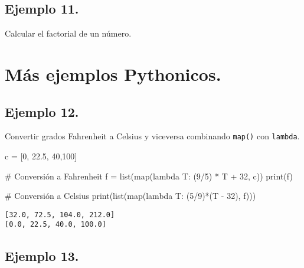 \documentclass[
  letterpaper,
  DIV=11,
  numbers=noendperiod]{scrreprt}
\newenvironment{Shaded}{\begin{snugshade}}{\end{snugshade}}
\newcommand{\BuiltInTok}[1]{\textcolor[rgb]{0.00,0.23,0.31}{#1}}
\newcommand{\CommentTok}[1]{\textcolor[rgb]{0.37,0.37,0.37}{#1}}
\newcommand{\DecValTok}[1]{\textcolor[rgb]{0.68,0.00,0.00}{#1}}
\newcommand{\FloatTok}[1]{\textcolor[rgb]{0.68,0.00,0.00}{#1}}
\newcommand{\KeywordTok}[1]{\textcolor[rgb]{0.00,0.23,0.31}{#1}}
\newcommand{\NormalTok}[1]{\textcolor[rgb]{0.00,0.23,0.31}{#1}}
\newcommand{\OperatorTok}[1]{\textcolor[rgb]{0.37,0.37,0.37}{#1}}
\begin{document}
\section{\texorpdfstring{\textbf{Ejemplo
11.}}{Ejemplo 11.}}\label{ejemplo-11.}

Calcular el factorial de un número.


\chapter{Más ejemplos Pythonicos.}\label{muxe1s-ejemplos-pythonicos.}

\section{\texorpdfstring{\textbf{Ejemplo
12.}}{Ejemplo 12.}}\label{ejemplo-12.}

Convertir grados Fahrenheit a Celsius y viceversa combinando
\texttt{map()} con \texttt{lambda}.

\begin{Shaded}
\begin{Highlighting}[]
\NormalTok{c }\OperatorTok{=}\NormalTok{ [}\DecValTok{0}\NormalTok{, }\FloatTok{22.5}\NormalTok{, }\DecValTok{40}\NormalTok{,}\DecValTok{100}\NormalTok{]}

\CommentTok{\# Conversión a Fahrenheit}
\NormalTok{f }\OperatorTok{=} \BuiltInTok{list}\NormalTok{(}\BuiltInTok{map}\NormalTok{(}\KeywordTok{lambda}\NormalTok{ T: (}\DecValTok{9}\OperatorTok{/}\DecValTok{5}\NormalTok{) }\OperatorTok{*}\NormalTok{ T }\OperatorTok{+} \DecValTok{32}\NormalTok{, c))}
\BuiltInTok{print}\NormalTok{(f)}

\CommentTok{\# Conversión a Celsius}
\BuiltInTok{print}\NormalTok{(}\BuiltInTok{list}\NormalTok{(}\BuiltInTok{map}\NormalTok{(}\KeywordTok{lambda}\NormalTok{ T: (}\DecValTok{5}\OperatorTok{/}\DecValTok{9}\NormalTok{)}\OperatorTok{*}\NormalTok{(T }\OperatorTok{{-}} \DecValTok{32}\NormalTok{), f)))}
\end{Highlighting}
\end{Shaded}

\begin{verbatim}
[32.0, 72.5, 104.0, 212.0]
[0.0, 22.5, 40.0, 100.0]
\end{verbatim}

\section{\texorpdfstring{\textbf{Ejemplo
13.}}{Ejemplo 13.}}\label{ejemplo-13.}
\end{document}
